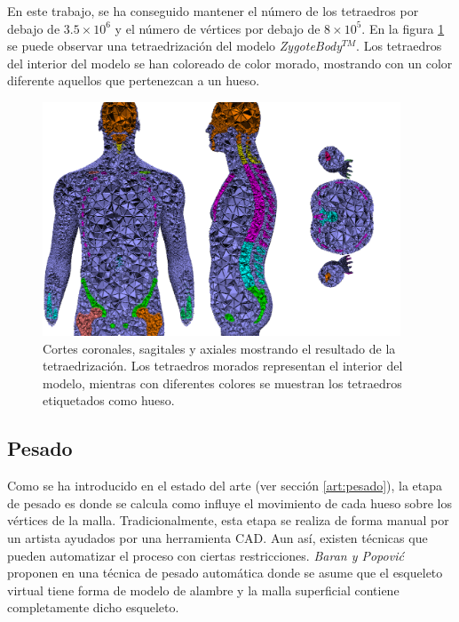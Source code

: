 En este trabajo, se ha conseguido mantener el número de los tetraedros por debajo de $3.5\times 10^6$ y el número de vértices por debajo de $8 \times 10^5$. 
En la figura \ref{fig:tetra} se puede observar una tetraedrización del modelo \emph{ZygoteBody}$^{TM}$. Los tetraedros del interior del modelo se han coloreado de color morado, mostrando con un color diferente aquellos que pertenezcan a un hueso.
%
\begin{figure}[th]
   \centering
    \includegraphics[width=0.95\textwidth]{IMG/boneid.png}
     \caption{Cortes coronales, sagitales y axiales mostrando el resultado de la tetraedrización. Los tetraedros morados representan el interior del modelo, mientras con diferentes colores se muestran los tetraedros etiquetados como hueso.}
\label{fig:tetra}
\end{figure} 

\subsection{Pesado}
\label{posing:pesado}
%
Como se ha introducido en el estado del arte (ver sección \ref{art:pesado}), la etapa de pesado es donde se calcula como influye el movimiento de cada hueso sobre los vértices de la malla.
Tradicionalmente, esta etapa se realiza de forma manual por un artista ayudados por una herramienta  \ac{CAD}. Aun así, existen técnicas que pueden automatizar el proceso con ciertas restricciones. \emph{Baran y Popovi\'{c}} proponen en \cite{Baran:2007} una técnica de pesado automática donde se asume que el esqueleto virtual tiene forma de modelo de alambre y la malla superficial contiene completamente dicho esqueleto.

